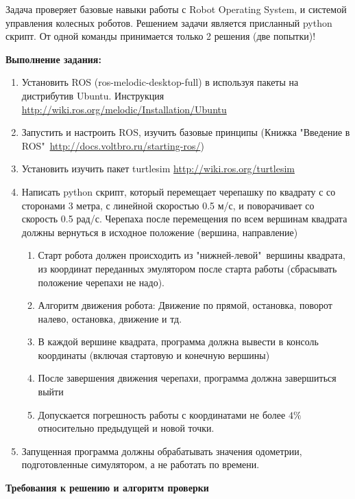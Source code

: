 
Задача проверяет базовые навыки работы с Robot Operating System, и системой управления колесных роботов. Решением задачи является присланный python скрипт. От одной команды принимается только 2 решения (две попытки)!

\textbf{Выполнение задания:}

\begin{enumerate}
    \item Установить ROS (ros-melodic-desktop-full) в используя пакеты на дистрибутив Ubuntu. Инструкция \url{http://wiki.ros.org/melodic/Installation/Ubuntu}
    \item Запустить и настроить ROS, изучить базовые принципы (Книжка "Введение в ROS"\ \url{http://docs.voltbro.ru/starting-ros/})
    \item Установить изучить пакет turtlesim \url{http://wiki.ros.org/turtlesim}
    \item Написать python скрипт, который перемещает черепашку по квадрату с со сторонами 3 метра, с линейной скоростью 0.5 м/с, и поворачивает со скорость 0.5 рад/с. Черепаха после перемещения по всем вершинам квадрата должны вернуться в исходное положение (вершина, направление)
    \begin{enumerate}
        \item Старт робота должен происходить из "нижней-левой"\ вершины квадрата, из координат переданных эмулятором после старта работы (сбрасывать положение черепахи не надо).
        \item Алгоритм движения робота: Движение по прямой, остановка, поворот налево, остановка, движение и тд.
        \item В каждой вершине квадрата, программа должна вывести в консоль координаты (включая стартовую и конечную вершины)
        \item После завершения движения черепахи, программа должна завершиться выйти
        \item Допускается погрешность работы с координатами не более $4\%$ относительно предыдущей и новой точки.
    \end{enumerate}
    \item Запущенная программа должны обрабатывать значения одометрии, подготовленные симулятором, а не работать по времени.
\end{enumerate}

\textbf{Требования к решению и алгоритм проверки}

